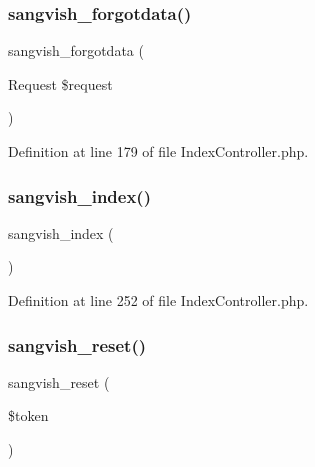 \mbox{\label{class_responsive_1_1_http_1_1_controllers_1_1_index_controller_ae448dcac25c0cc0daa64c79c11e63280}} 
\subsubsection{\texorpdfstring{sangvish\_forgotdata()}{sangvish\_forgotdata()}}
{\footnotesize\ttfamily sangvish\+\_\+forgotdata (\begin{DoxyParamCaption}\item[{Request}]{\$request }\end{DoxyParamCaption})}



Definition at line 179 of file Index\+Controller.\+php.

\mbox{\label{class_responsive_1_1_http_1_1_controllers_1_1_index_controller_a102ddc90c5f30fa7831dcf999b905ad1}} 
\subsubsection{\texorpdfstring{sangvish\_index()}{sangvish\_index()}}
{\footnotesize\ttfamily sangvish\+\_\+index (\begin{DoxyParamCaption}{ }\end{DoxyParamCaption})}



Definition at line 252 of file Index\+Controller.\+php.

\mbox{\label{class_responsive_1_1_http_1_1_controllers_1_1_index_controller_a13df1c6af1c0eb14b7d2eb626f06517d}} 
\subsubsection{\texorpdfstring{sangvish\_reset()}{sangvish\_reset()}}
{\footnotesize\ttfamily sangvish\+\_\+reset (\begin{DoxyParamCaption}\item[{}]{\$token }\end{DoxyParamCaption})}




